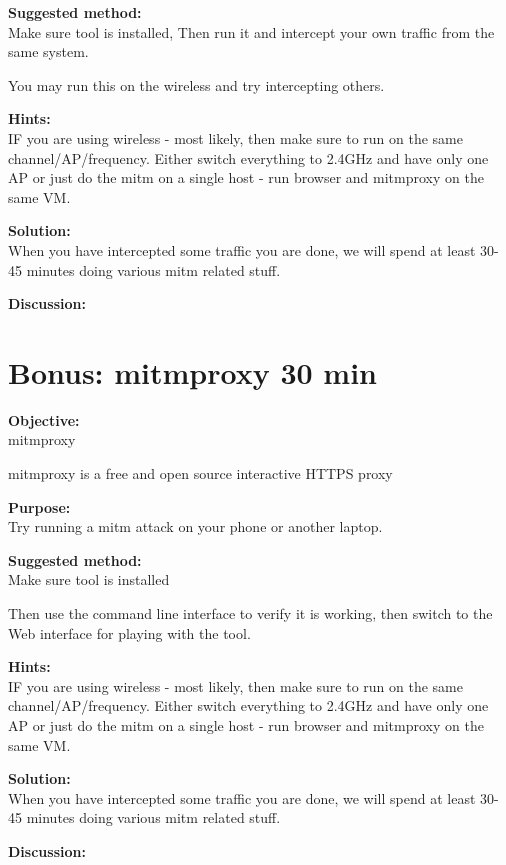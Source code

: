 \documentclass[a4paper,11pt,notitlepage]{report}
\begin{document}
{\bf Suggested method:}\\
Make sure tool is installed, Then run it and intercept your own traffic from the same system.

You may run this on the wireless and try intercepting others.

{\bf Hints:}\\
IF you are using wireless - most likely, then make sure to run on the same channel/AP/frequency. Either switch everything to 2.4GHz and have only one AP or just do the mitm on a single host - run browser and mitmproxy on the same VM.

{\bf Solution:}\\
When you have intercepted some traffic you are done, we will spend at least 30-45 minutes doing various mitm related stuff.

{\bf Discussion:}\\



\chapter{Bonus: mitmproxy 30 min}
\label{ex:mitmproxy}

{\bf Objective:}\\
mitmproxy 

mitmproxy is a free and open source interactive HTTPS proxy

{\bf Purpose:}\\
Try running a mitm attack on your phone or another laptop.

{\bf Suggested method:}\\
Make sure tool is installed

Then use the command line interface to verify it is working, then switch to the Web interface for playing with the tool.

{\bf Hints:}\\
IF you are using wireless - most likely, then make sure to run on the same channel/AP/frequency. Either switch everything to 2.4GHz and have only one AP or just do the mitm on a single host - run browser and mitmproxy on the same VM.

{\bf Solution:}\\
When you have intercepted some traffic you are done, we will spend at least 30-45 minutes doing various mitm related stuff.

{\bf Discussion:}\\
\end{document}
